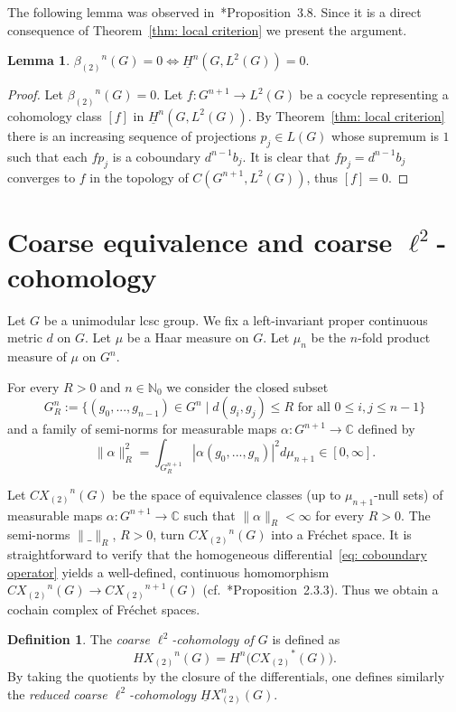 \documentclass[10pt]{amsart}
\theoremstyle{plain}
\theoremstyle{definition}
\newtheorem{defn}[thm]{Definition}
\newtheorem{lem}[thm]{Lemma}
\theoremstyle{remark}
\begin{document}
The following lemma was observed in~\cite{petersen}*{Proposition~3.8}.
Since it is a direct consequence of Theorem~\ref{thm: local criterion} we present the argument.

\begin{lem}\label{lem: vanishing of reduced cohomology and l2 betti}
${\beta_{(2)}}^n(G)=0 \Leftrightarrow \underline{H}^n(G, L^2(G))=0.$
\end{lem}

\begin{proof}
Let ${\beta_{(2)}}^n(G)=0$. Let $f\colon G^{n+1}\to L^2(G)$ be a cocycle representing a cohomology class $[f]$ in $\underline{H}^n(G, L^2(G))$.
By Theorem~\ref{thm: local criterion} there is an increasing sequence of projections $p_j\in L(G)$ whose supremum is $1$ such that each $fp_j$ is a coboundary $d^{n-1}b_j$. It is clear that $fp_j=d^{n-1}b_j$ converges to $f$ in the topology of $C(G^{n+1}, L^2(G))$, thus $[f]=0$.
\end{proof}

\section{Coarse equivalence and coarse $\ell^2$-cohomology}\label{sec: coarse cohomology}

Let $G$ be a unimodular lcsc group. We fix a left-invariant proper continuous metric $d$ on $G$. Let $\mu$ be a Haar measure on $G$. Let $\mu_{n}$ be the $n$-fold product measure of $\mu$ on $G^n$. 

 For every $R>0$ and $n\in\mathbb{N}_0$ we consider the closed subset
\[G_R^n:=\lbrace(g_0,...,g_{n-1})\in G^{n}\;|\;d(g_i,g_j)\leq R\text{ for all }0\leq i,j\leq n\!-\!1 \rbrace\]
and a family of semi-norms for measurable maps $\alpha\colon G^{n+1}\to\mathbb{C}$ defined by
\[\|\alpha\|_R^2=\int_{G_R^{n+1}}|\alpha(g_0,...,g_n)|^2d\mu_{n+1}\in [0,\infty].\]

Let ${CX_{(2)}}^{n}(G)$ be the space of equivalence 
classes (up to $\mu_{n+1}$-null sets) of measurable maps $\alpha\colon G^{n+1}\to\mathbb{C}$  such that $\|\alpha\|_R<\infty$ for every $R>0$. The semi-norms $\|\_\|_R$, $R>0$, turn ${CX_{(2)}}^{n}(G)$ into a 
Fr\'{e}chet space. It is straightforward to verify that the 
homogeneous differential~\eqref{eq: coboundary operator} 
yields a well-defined, continuous homomorphism 
${CX_{(2)}}^{n}(G)\to {CX_{(2)}}^{n+1}(G)$ (cf.~\cite{genton}*{Proposition~2.3.3}). 
Thus we obtain a cochain complex of Fr\'{e}chet spaces. 

\begin{defn} The \emph{coarse $\ell^2$-cohomology of $G$} is defined as 
\[{HX_{(2)}}^n(G)=H^n\bigl({CX_{(2)}}^\ast(G)\bigr).\]
By taking the quotients by the closure of the differentials, one defines similarly the \emph{reduced coarse $\ell^2$-cohomology} $\underline{H}X_{(2)}^n(G)$. 
\end{defn}
\end{document}
